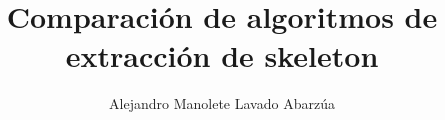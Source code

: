 \documentclass[spanish,letterpaper]{templates/uchile-tesis}
\title{Comparación de algoritmos de extracción de skeleton}
\author{Alejandro Manolete Lavado Abarzúa}
\begin{document}
\listoftodos
\newpage

\maketitle











\end{document}
